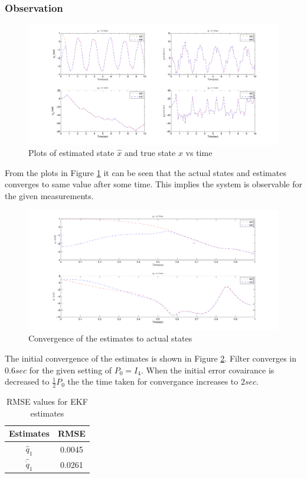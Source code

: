 \subsubsection{Observation}
\begin{figure}
	\centering
	\includegraphics[angle=90,scale=0.5]{Bilder/plots/idp/idp_plot.pdf}
	\caption{ Plots of estimated state $\hat x$ and true state $x$ vs time}
	\label{fig:idp_plot}
\end{figure}

From the plots in Figure \ref{fig:idp_plot} it can be seen that the actual states and estimates converges to same value after some time. This implies the system is observable for the given measurements. 
\begin{figure}
    \centering
    \includegraphics[trim= 30mm 0mm 30mm 0mm,clip,width=\linewidth]{Bilder/plots/idp/init_beh.pdf}
    \caption{ Convergence of the estimates to actual states }
    \label{fig:idp_init_conv}
\end{figure}
The initial convergence of the estimates is shown in Figure \ref{fig:idp_init_conv}. Filter converges in $0.6 sec$ for the given setting of $P_0=I_4$. When the initial error covairance is decreased to $\frac{1}{2}P_0$ the the time taken for convergance increases to $2 sec$. 

\begin{table}[H]
    \centering
    \begin{tabular}{|c|c|}
    \hline
    Estimates &RMSE \\ \hline
    $\hat q_1$   &0.0045 \\ \hline
    $\hat {\dot q}_1$ & 0.0261 \\ \hline
    \end{tabular}
    \caption{RMSE values for EKF estimates}
    \label{tab:idp_rmse_ekf}
\end{table}

